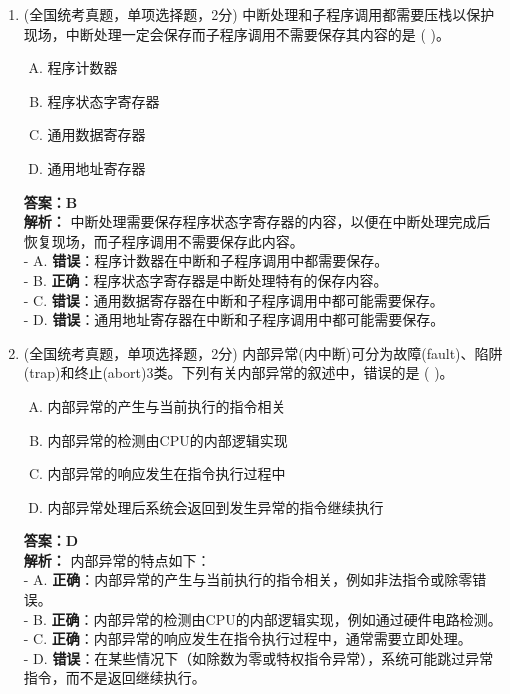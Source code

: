 \documentclass[lang=cn,newtx,10pt,scheme=chinese]{../../elegantbook}
\begin{document}
\begin{enumerate}
\item (全国统考真题，单项选择题，2分) 中断处理和子程序调用都需要压栈以保护现场，中断处理一定会保存而子程序调用不需要保存其内容的是 (    )。
    \begin{enumerate}[A.]
        \item 程序计数器
        \item 程序状态字寄存器
        \item 通用数据寄存器
        \item 通用地址寄存器
    \end{enumerate}
    \textbf{答案：B}\\
    \textbf{解析：} 中断处理需要保存程序状态字寄存器的内容，以便在中断处理完成后恢复现场，而子程序调用不需要保存此内容。\\
    - A. \textbf{错误}：程序计数器在中断和子程序调用中都需要保存。\\
    - B. \textbf{正确}：程序状态字寄存器是中断处理特有的保存内容。\\
    - C. \textbf{错误}：通用数据寄存器在中断和子程序调用中都可能需要保存。\\
    - D. \textbf{错误}：通用地址寄存器在中断和子程序调用中都可能需要保存。\\

    \item (全国统考真题，单项选择题，2分) 内部异常(内中断)可分为故障(fault)、陷阱(trap)和终止(abort)3类。下列有关内部异常的叙述中，错误的是 (    )。
    \begin{enumerate}[A.]
        \item 内部异常的产生与当前执行的指令相关
        \item 内部异常的检测由CPU的内部逻辑实现
        \item 内部异常的响应发生在指令执行过程中
        \item 内部异常处理后系统会返回到发生异常的指令继续执行
    \end{enumerate}
    \textbf{答案：D}\\
    \textbf{解析：} 内部异常的特点如下：\\
    - A. \textbf{正确}：内部异常的产生与当前执行的指令相关，例如非法指令或除零错误。\\
    - B. \textbf{正确}：内部异常的检测由CPU的内部逻辑实现，例如通过硬件电路检测。\\
    - C. \textbf{正确}：内部异常的响应发生在指令执行过程中，通常需要立即处理。\\
    - D. \textbf{错误}：在某些情况下（如除数为零或特权指令异常），系统可能跳过异常指令，而不是返回继续执行。\\


\end{enumerate}
\end{document}
